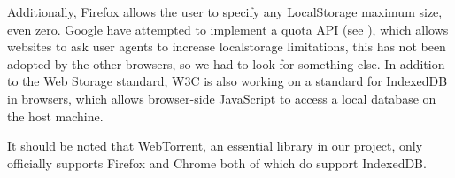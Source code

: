 Additionally, Firefox allows the user to specify any LocalStorage maximum size, even zero. 
Google have attempted to implement a quota \acs{API} (see \citep{QuotaAPI}), 
which allows websites to ask user agents to increase localstorage limitations,
this has not been adopted by the other browsers, so we had to look for something else.
\newline\newline
In addition to the Web Storage standard, W3C is also working on a standard for IndexedDB in browsers, 
which allows browser-side JavaScript to access a local database on the host machine.

It should be noted that WebTorrent, 
an essential library in our project, 
only officially supports Firefox and Chrome 
both of which do support IndexedDB.

